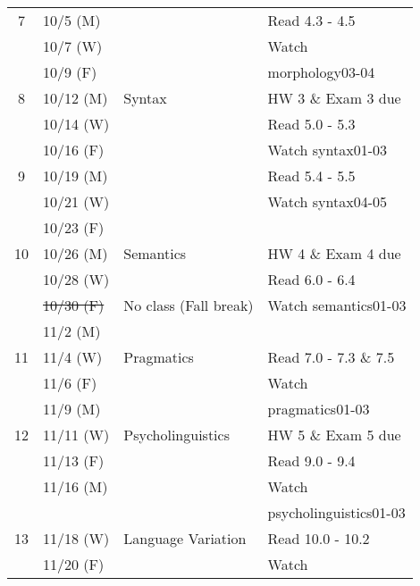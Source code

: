 \documentclass{article}
\begin{document}
\begin{longtable}{c l l | l}
      \hline
      7     & 10/5 (M)    &                                 & Read 4.3 - 4.5\\
            & 10/7 (W)    &                                 & Watch\\
            & 10/9 (F)    &                                 & morphology03-04\\
      \hline
      8     & 10/12 (M)   & Syntax                          & HW 3 \& Exam 3 due\\
            & 10/14 (W)   &                                 & Read 5.0 - 5.3\\
            & 10/16 (F)   &                                 & Watch syntax01-03\\
      \hline
      9     & 10/19 (M)   &                                 & Read 5.4 - 5.5\\
            & 10/21 (W)   &                                 & Watch syntax04-05\\
            & 10/23 (F)   &                                 & \\
      \hline
      10    & 10/26 (M)   & Semantics                       & HW 4 \& Exam 4 due\\
            & 10/28 (W)   &                                 & Read 6.0 - 6.4\\
            & \sout{10/30 (F)}   & No class (Fall break)    & Watch semantics01-03\\
            & 11/2 (M)    &                                 & \\
      \hline
      11    & 11/4 (W)    & Pragmatics                      & Read 7.0 - 7.3 \& 7.5\\
            & 11/6 (F)    &                                 & Watch\\
            & 11/9 (M)    &                                 & pragmatics01-03\\
      \hline
      12    & 11/11 (W)   & Psycholinguistics               & HW 5 \& Exam 5 due\\
            & 11/13 (F)   &                                 & Read 9.0 - 9.4\\
            & 11/16 (M)   &                                 & Watch\\
            &             &                                 & psycholinguistics01-03\\
      \hline
      13    & 11/18 (W)   & Language Variation              & Read 10.0 - 10.2\\
            & 11/20 (F)   &                                 & Watch\\

\end{longtable}
\end{document}
